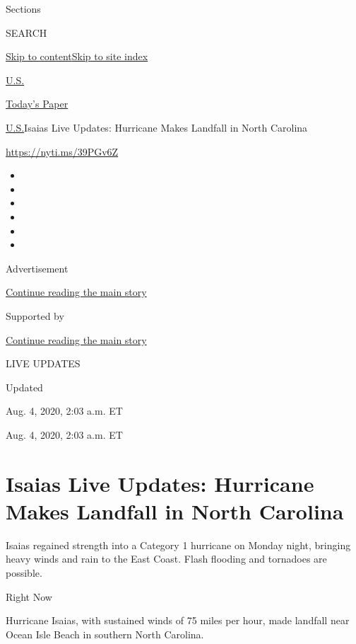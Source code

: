 Sections

SEARCH

\protect\hyperlink{site-content}{Skip to
content}\protect\hyperlink{site-index}{Skip to site index}

\href{https://www.nytimes.com/section/us}{U.S.}

\href{https://myaccount.nytimes.com/auth/login?response_type=cookie\&client_id=vi}{}

\href{https://www.nytimes.com/section/todayspaper}{Today's Paper}

\href{/section/us}{U.S.}\textbar{}Isaias Live Updates: Hurricane Makes
Landfall in North Carolina

\url{https://nyti.ms/39PGv6Z}

\begin{itemize}
\item
\item
\item
\item
\item
\item
\end{itemize}

Advertisement

\protect\hyperlink{after-top}{Continue reading the main story}

Supported by

\protect\hyperlink{after-sponsor}{Continue reading the main story}

LIVE UPDATES

Updated~

Aug. 4, 2020, 2:03 a.m. ET

Aug. 4, 2020, 2:03 a.m. ET

\hypertarget{isaias-live-updates-hurricane-makes-landfall-in-north-carolina}{%
\section{Isaias Live Updates: Hurricane Makes Landfall in North
Carolina}\label{isaias-live-updates-hurricane-makes-landfall-in-north-carolina}}

Isaias regained strength into a Category 1 hurricane on Monday night,
bringing heavy winds and rain to the East Coast. Flash flooding and
tornadoes are possible.

Right Now

Hurricane Isaias, with sustained winds of 75 miles per hour, made
landfall near Ocean Isle Beach in southern North Carolina.

